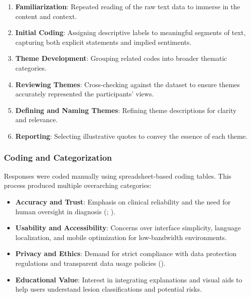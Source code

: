 \documentclass[
  12pt,
  oneside]{article}
\providecommand{\tightlist}{%
  \setlength{\itemsep}{0pt}\setlength{\parskip}{0pt}}
\begin{document}
\begin{enumerate}
\def\labelenumi{\arabic{enumi}.}
\tightlist
\item
  \textbf{Familiarization}: Repeated reading of the raw text data to
  immerse in the content and context.
\item
  \textbf{Initial Coding}: Assigning descriptive labels to meaningful
  segments of text, capturing both explicit statements and implied
  sentiments.
\item
  \textbf{Theme Development}: Grouping related codes into broader
  thematic categories.
\item
  \textbf{Reviewing Themes}: Cross-checking against the dataset to
  ensure themes accurately represented the participants' views.
\item
  \textbf{Defining and Naming Themes}: Refining theme descriptions for
  clarity and relevance.
\item
  \textbf{Reporting}: Selecting illustrative quotes to convey the
  essence of each theme.
\end{enumerate}

\subsubsection{Coding and
Categorization}\label{coding-and-categorization}

Responses were coded manually using spreadsheet-based coding tables.
This process produced multiple overarching categories:

\begin{itemize}
\tightlist
\item
  \textbf{Accuracy and Trust}: Emphasis on clinical reliability and the
  need for human oversight in diagnosis
  (;
  ).
\item
  \textbf{Usability and Accessibility}: Concerns over interface
  simplicity, language localization, and mobile optimization for
  low-bandwidth environments.
\item
  \textbf{Privacy and Ethics}: Demand for strict compliance with data
  protection regulations and transparent data usage policies
  ().
\item
  \textbf{Educational Value}: Interest in integrating explanations and
  visual aids to help users understand lesion classifications and
  potential risks.
\end{itemize}
\end{document}
